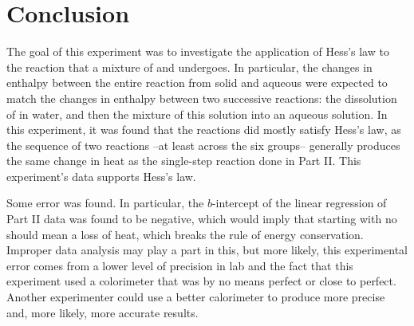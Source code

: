 \section{Conclusion}

The goal of this experiment was to investigate the application of Hess's law to the 
reaction that a mixture of \koh and \hcl undergoes. In particular, the changes in enthalpy between the entire reaction from solid \koh and aqueous \hcl were expected to match the changes in enthalpy between two successive reactions: the dissolution of \koh in water, and then the mixture of this solution into an aqueous \hcl solution.
In this experiment, it was found that the reactions did mostly satisfy Hess's law, as the sequence of two reactions --at least across the six groups-- generally produces the same change in heat as the single-step reaction done in Part II. This experiment's data supports Hess's law. 

Some error was found. In particular, the $b$-intercept of the linear regression of Part II data
was found to be negative, which would imply that starting with no \koh should mean a loss of heat, which breaks the rule of energy conservation.
Improper data analysis may play a part in this, but more likely, this experimental error comes from a lower level of precision in lab and the fact that this experiment used a colorimeter that was by no means perfect or close to perfect. Another experimenter could use a better calorimeter to produce more precise and, more likely, more accurate results.

